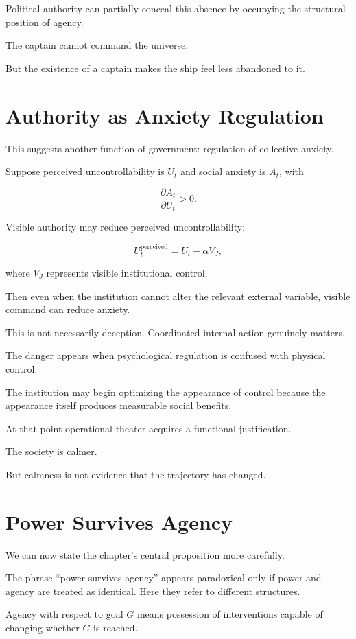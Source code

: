 \documentclass[11pt,oneside]{book}
\theoremstyle{definition}
\theoremstyle{remark}
\begin{document}
Political authority can partially conceal this absence by occupying the structural position of agency.

The captain cannot command the universe.

But the existence of a captain makes the ship feel less abandoned to it.

\section{Authority as Anxiety Regulation}

This suggests another function of government: regulation of collective anxiety.

Suppose perceived uncontrollability is \(U_t\) and social anxiety is \(A_t\), with

\[
\frac{\partial A_t}{\partial U_t}>0.
\]

Visible authority may reduce perceived uncontrollability:

\[
U_t^{\mathrm{perceived}}
=
U_t-\alpha V_J,
\]

where \(V_J\) represents visible institutional control.

Then even when the institution cannot alter the relevant external variable, visible command can reduce anxiety.

This is not necessarily deception. Coordinated internal action genuinely matters.

The danger appears when psychological regulation is confused with physical control.

The institution may begin optimizing the appearance of control because the appearance itself produces measurable social benefits.

At that point operational theater acquires a functional justification.

The society is calmer.

But calmness is not evidence that the trajectory has changed.

\section{Power Survives Agency}

We can now state the chapter's central proposition more carefully.

The phrase ``power survives agency'' appears paradoxical only if power and agency are treated as identical. Here they refer to different structures.

Agency with respect to goal \(G\) means possession of interventions capable of changing whether \(G\) is reached.
\end{document}
